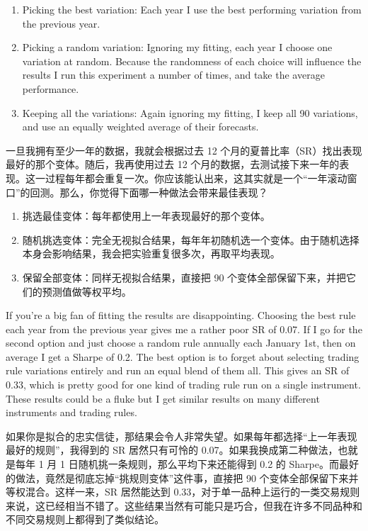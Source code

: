 \begin{enumerate}
\item Picking the best variation: Each year I use the best performing variation from the previous year.
\item Picking a random variation: Ignoring my fitting, each year I choose one variation at random. Because the randomness of each choice will influence the results I run this experiment a number of times, and take the average performance.
\item Keeping all the variations: Again ignoring my fitting, I keep all 90 variations, and use an equally weighted average of their forecasts. \end{enumerate}

\begin{chineseblock}一旦我拥有至少一年的数据，我就会根据过去 12 个月的夏普比率（SR）找出表现最好的那个变体。随后，我再使用过去 12 个月的数据，去测试接下来一年的表现。这一过程每年都会重复一次。你应该能认出来，这其实就是一个“一年滚动窗口”的回测。那么，你觉得下面哪一种做法会带来最佳表现？\end{chineseblock}

\begin{enumerate}
\item 挑选最佳变体：每年都使用上一年表现最好的那个变体。
\item 随机挑选变体：完全无视拟合结果，每年年初随机选一个变体。由于随机选择本身会影响结果，我会把实验重复很多次，再取平均表现。
\item 保留全部变体：同样无视拟合结果，直接把 90 个变体全部保留下来，并把它们的预测值做等权平均。\end{enumerate}

\begin{englishblock} If you're a big fan of fitting the results are disappointing. Choosing the best rule each year from the previous year gives me a rather poor SR of 0.07. If I go for the second option and just choose a random rule annually each January 1st, then on average I get a Sharpe of 0.2. The best option is to forget about selecting trading rule variations entirely and run an equal blend of them all. This gives an SR of 0.33, which is pretty good for one kind of trading rule run on a single instrument. These results could be a fluke but I get similar results on many different instruments and trading rules. \end{englishblock}

\begin{chineseblock}如果你是拟合的忠实信徒，那结果会令人非常失望。如果每年都选择“上一年表现最好的规则”，我得到的 SR 居然只有可怜的 0.07。如果我换成第二种做法，也就是每年 1 月 1 日随机挑一条规则，那么平均下来还能得到 0.2 的 Sharpe。而最好的做法，竟然是彻底忘掉“挑规则变体”这件事，直接把 90 个变体全部保留下来并等权混合。这样一来，SR 居然能达到 0.33，对于单一品种上运行的一类交易规则来说，这已经相当不错了。这些结果当然有可能只是巧合，但我在许多不同品种和不同交易规则上都得到了类似结论。\end{chineseblock}

